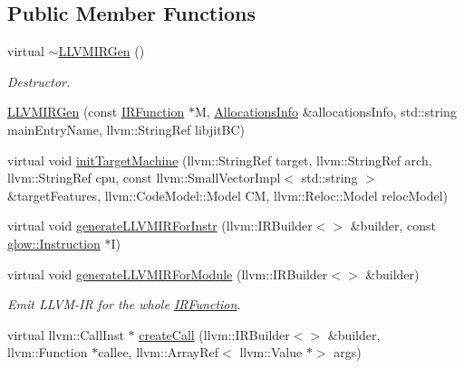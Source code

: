 \subsection*{Public Member Functions}
\begin{DoxyCompactItemize}
\item 
\mbox{\label{classglow_1_1_l_l_v_m_i_r_gen_abe35676f1aeccb43fddc4b01585f372d}} 
virtual \hyperlink{classglow_1_1_l_l_v_m_i_r_gen_abe35676f1aeccb43fddc4b01585f372d}{$\sim$\+L\+L\+V\+M\+I\+R\+Gen} ()
\begin{DoxyCompactList}\small\item\em Destructor. \end{DoxyCompactList}\item 
\hyperlink{classglow_1_1_l_l_v_m_i_r_gen_a9bfb6f7f1baf45078e1686d0c0530fef}{L\+L\+V\+M\+I\+R\+Gen} (const \hyperlink{classglow_1_1_i_r_function}{I\+R\+Function} $\ast$M, \hyperlink{structglow_1_1_allocations_info}{Allocations\+Info} \&allocations\+Info, std\+::string main\+Entry\+Name, llvm\+::\+String\+Ref libjit\+BC)
\item 
virtual void \hyperlink{classglow_1_1_l_l_v_m_i_r_gen_a712d537a8810928bb5b6836a3e1b36f6}{init\+Target\+Machine} (llvm\+::\+String\+Ref target, llvm\+::\+String\+Ref arch, llvm\+::\+String\+Ref cpu, const llvm\+::\+Small\+Vector\+Impl$<$ std\+::string $>$ \&target\+Features, llvm\+::\+Code\+Model\+::\+Model CM, llvm\+::\+Reloc\+::\+Model reloc\+Model)
\item 
virtual void \hyperlink{classglow_1_1_l_l_v_m_i_r_gen_a8b36e4f70a5e436f3b29e54303ad1401}{generate\+L\+L\+V\+M\+I\+R\+For\+Instr} (llvm\+::\+I\+R\+Builder$<$$>$ \&builder, const \hyperlink{classglow_1_1_instruction}{glow\+::\+Instruction} $\ast$I)
\item 
\mbox{\label{classglow_1_1_l_l_v_m_i_r_gen_a0aa96711f023e2256bd0264508c9d093}} 
virtual void \hyperlink{classglow_1_1_l_l_v_m_i_r_gen_a0aa96711f023e2256bd0264508c9d093}{generate\+L\+L\+V\+M\+I\+R\+For\+Module} (llvm\+::\+I\+R\+Builder$<$$>$ \&builder)
\begin{DoxyCompactList}\small\item\em Emit L\+L\+V\+M-\/\+IR for the whole \hyperlink{classglow_1_1_i_r_function}{I\+R\+Function}. \end{DoxyCompactList}\item 
virtual llvm\+::\+Call\+Inst $\ast$ \hyperlink{classglow_1_1_l_l_v_m_i_r_gen_a01ce9483d4fc06df377217a0e7c4c855}{create\+Call} (llvm\+::\+I\+R\+Builder$<$$>$ \&builder, llvm\+::\+Function $\ast$callee, llvm\+::\+Array\+Ref$<$ llvm\+::\+Value $\ast$$>$ args)

\end{DoxyCompactItemize}
